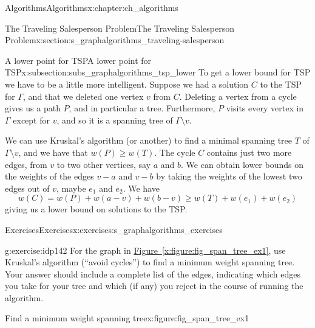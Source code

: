 \documentclass[oneside,10pt,]{book}
\newcommand{\xreffont}{\relax}
\numberwithin{equation}{section}
\begin{document}
\begin{chapterptx}{Algorithms}{}{Algorithms}{}{}{x:chapter:ch_algorithms}
\begin{sectionptx}{The Traveling Salesperson Problem}{}{The Traveling Salesperson Problem}{}{}{x:section:s_graphalgorithms_traveling-salesperson}
%
%
\typeout{************************************************}
\typeout{************************************************}
%
\begin{subsectionptx}{A lower point for TSP}{}{A lower point for TSP}{}{}{x:subsection:subs_graphalgorithms_tsp_lower}
To get a lower bound for TSP we have to be a little more intelligent.  Suppose we had a solution \(C\) to the TSP for \(\Gamma\), and that we deleted one vertex \(v\) from \(C\).  Deleting a vertex from a cycle gives us a path \(P\), and in particular a tree.  Furthermore, \(P\) visits every vertex in \(\Gamma\) except for \(v\), and so it is a spanning tree of \(\Gamma\setminus v\).%
\par
We can use Kruskal's algorithm (or another) to find a minimal spanning tree \(T\) of \(\Gamma\setminus v\), and we have that \(w(P)\geq w(T)\).  The cycle \(C\) contains just two more edges, from \(v\) to two other vertices, say \(a\) and \(b\).  We can obtain lower bounds on the weights of the edges \(v-a\) and \(v-b\) by taking the weights of the lowest two edges out of \(v\), maybe \(e_1\) and \(e_2\).  We have%
%
\begin{equation*}
w(C)=w(P)+w(a-v)+w(b-v)\geq w(T)+w(e_1)+w(e_2)
\end{equation*}
giving us a lower bound on solutions to the TSP.%
\end{subsectionptx}
\end{sectionptx}
%
%
\typeout{************************************************}
\typeout{************************************************}
%
\begin{exercises-section}{Exercises}{}{Exercises}{}{}{x:exercises:s_graphalgorithms_exercises}
\begin{divisionexercise}{1}{}{}{g:exercise:idp142}%
For the graph in \hyperref[x:figure:fig_span_tree_ex1]{Figure~{\xreffont\ref{x:figure:fig_span_tree_ex1}}}, use Kruskal's algorithm (``avoid cycles'') to find a minimum weight spanning tree. Your answer should include a complete list of the edges, indicating which edges you take for your tree and which (if any) you reject in the course of running the algorithm.%
\begin{figureptx}{Find a minimum weight spanning tree}{x:figure:fig_span_tree_ex1}{}%
\begin{image}{0.175}{0.65}{0.175}%

\end{image}
\end{figureptx}
\end{divisionexercise}
\end{exercises-section}
\end{chapterptx}
\end{document}
